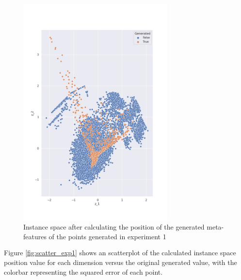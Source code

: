\begin{figure}
    \centering
    \includegraphics[width=0.7\textwidth]{Cap5/all_coords1.png}
    \caption{Instance space after calculating the position of the generated meta-features of the points generated in experiment 1}
    \label{fig:is_exp1}
\end{figure}

Figure \ref{fig:scatter_exp1} shows an scatterplot of the calculated instance space position value for each dimension versus the original generated value, with the colorbar representing the squared error of each point.

